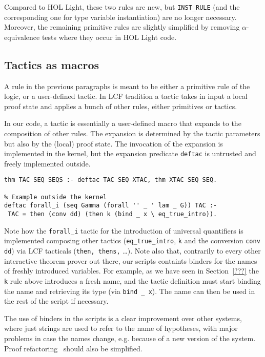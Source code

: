 \documentclass[preprint]{sigplanconf}
\begin{document}
Compared to HOL Light, these two rules are new, but {\small \verb+INST_RULE+} (and the corresponding one for type variable instantiation) are no longer necessary. Moreover, the remaining primitive rules are slightly simplified by removing $\alpha$-equivalence tests where they occur in HOL Light code.

\subsection{Tactics as macros}
A rule in the previous paragraphs is meant to be either a primitive rule of the logic, or a user-defined tactic. In LCF tradition a tactic takes in input a local proof state and applies a bunch of other rules, either primitives or tactics.

In our code, a tactic is essentially a user-defined macro that expands to the composition of other rules. The expansion is determined by the tactic parameters but also by the (local) proof state. The invocation of the expansion is implemented in the kernel, but the expansion predicate \verb+deftac+ is untrusted and freely implemented outside.

\begin{small}
\begin{verbatim}
thm TAC SEQ SEQS :- deftac TAC SEQ XTAC, thm XTAC SEQ SEQ.

% Example outside the kernel
deftac forall_i (seq Gamma (forall '' _ ' lam _ G)) TAC :-
 TAC = then (conv dd) (then k (bind _ x \ eq_true_intro)).
\end{verbatim}
\end{small}

Note how the \verb+forall_i+ tactic for the introduction of universal quantifiers is implemented composing other tactics (\verb+eq_true_intro+, \verb+k+ and the conversion \verb+conv dd+) via LCF tacticals (\verb+then, thens,+ \ldots). Note also that, contrarily to every other interactive theorem prover out there, our scripts containts binders for the names of freshly introduced variables. For example, as we have seen in Section~\ref{???} the \verb+k+ rule above introduces a fresh name, and the tactic definition must start binding the name and retrieving its type (via \verb+bind _ x+). The name can then be used in the rest of the script if necessary.

The use of binders in the scripts is a clear improvement over other systems, where just strings are used to refer to the name of hypotheses, with major problems in case the names change, e.g. because of a new version of the system. Proof refactoring~\cite{iain1} should also be simplified.
\end{document}
